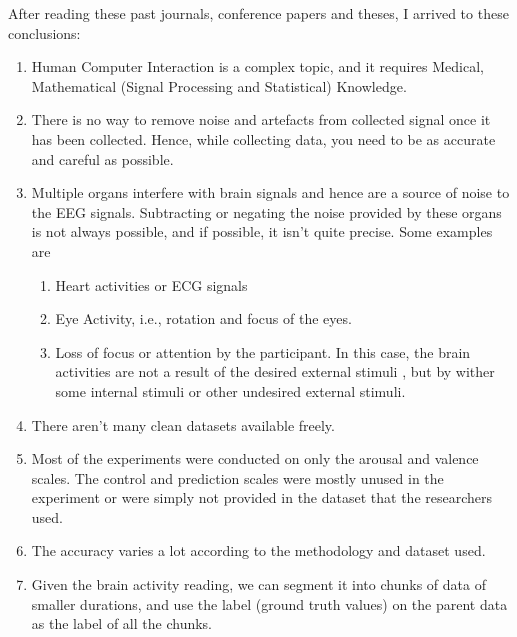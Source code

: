 After reading these past journals, conference papers and theses, I arrived to these conclusions:
\begin{enumerate}
    \item Human Computer Interaction is a complex topic, and it requires Medical, Mathematical (Signal Processing and Statistical) Knowledge.
    \item There is no way to remove noise and artefacts from collected signal once it has been collected. Hence, while collecting data, you need to be as accurate and careful as possible.
    \item Multiple organs interfere with brain signals and hence are a source of noise to the EEG signals. Subtracting or negating the noise provided by these organs is not always possible, and if possible, it isn't quite precise. Some examples are 
    \begin{enumerate}
        \item Heart activities or ECG signals
        \item Eye Activity, i.e., rotation and focus of the eyes.
        \item Loss of focus or attention by the participant. In this case, the brain activities are not a result of the desired external stimuli , but by wither some internal stimuli or other undesired external stimuli.
    \end{enumerate}
    \item There aren't many clean datasets available freely.
    \item Most of the experiments were conducted on only the arousal and valence scales. The control and prediction scales were mostly unused in the experiment or were simply not provided in the dataset that the researchers used.
    \item The accuracy varies a lot according to the methodology and dataset used.
    \item Given the brain activity reading, we can segment it into chunks of data of smaller durations, and use the label (ground truth values) on the parent data as the label of all the chunks.\cite{window}
\end{enumerate}

